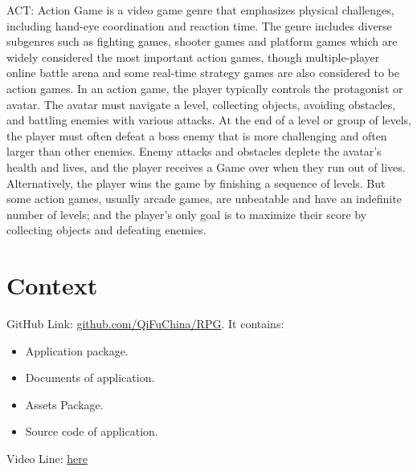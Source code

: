 ACT: Action Game is a video game genre that emphasizes physical challenges, including hand-eye coordination and reaction time. The genre includes diverse subgenres such as fighting games, shooter games and platform games which are widely considered the most important action games, though multiple-player online battle arena and some real-time strategy games are also considered to be action games. In an action game, the player typically controls the protagonist or avatar. The avatar must navigate a level, collecting objects, avoiding obstacles, and battling enemies with various attacks. At the end of a level or group of levels, the player must often defeat a boss enemy that is more challenging and often larger than other enemies. Enemy attacks and obstacles deplete the avatar's health and lives, and the player receives a Game over when they run out of lives. Alternatively, the player wins the game by finishing a sequence of levels. But some action games, usually arcade games, are unbeatable and have an indefinite number of levels; and the player's only goal is to maximize their score by collecting objects and defeating enemies.

\chapter{Context}
GitHub Link: \href{https://github.com/QiFuChina/RPG}{github.com/QiFuChina/RPG}. 
It contains:
\begin{itemize}
\item Application package.
\item Documents of application. 
\item Assets Package.
\item Source code of application.
\end{itemize}
Video Line: \href{https://youtu.be/4Db_27HFujA}{here}
